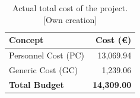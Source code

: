 \vspace{-1em}

\begin{table}[H]
    \renewcommand{\arraystretch}{1.2}
    \centering
    \footnotesize
    \begin{tabular}{@{}l r@{}}
     \textbf{Concept} & \textbf{Cost (€)} \\ [6pt]
     \hline 
     Personnel Cost (PC) & 13,069.94  \\
     Generic Cost (GC) & 1,239.06  \\
     \hline
     \textbf{Total Budget} & \textbf{14,309.00}  \\
    \end{tabular}%
    \caption[Actual total cost of the project]
    {Actual total cost of the project. [Own creation]} 
    \vspace{-1em}
    \label{table:actual-total-cost-of-project}
\end{table}

\vspace{-15pt}


 
